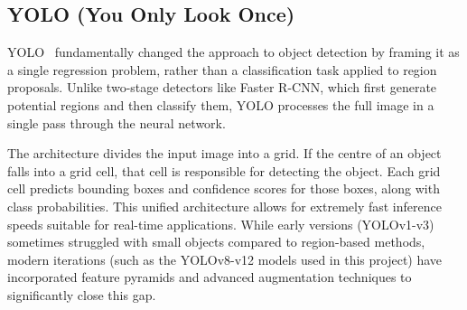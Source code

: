 \documentclass{article}
\begin{document}
\subsection{YOLO (You Only Look Once)}
YOLO~\cite{yolo} fundamentally changed the approach to object detection by framing it as a single regression problem, rather than a classification task applied to region proposals. Unlike two-stage detectors like Faster R-CNN, which first generate potential regions and then classify them, YOLO processes the full image in a single pass through the neural network.

The architecture divides the input image into a grid. If the centre of an object falls into a grid cell, that cell is responsible for detecting the object. Each grid cell predicts bounding boxes and confidence scores for those boxes, along with class probabilities. This unified architecture allows for extremely fast inference speeds suitable for real-time applications. While early versions (YOLOv1-v3) sometimes struggled with small objects compared to region-based methods, modern iterations (such as the YOLOv8-v12 models used in this project) have incorporated feature pyramids and advanced augmentation techniques to significantly close this gap.
\end{document}
